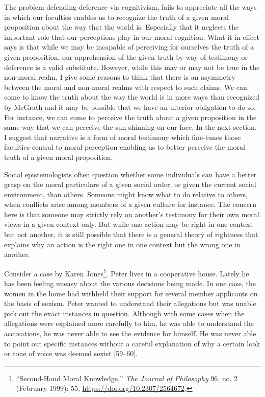 \documentclass[phdthesis,12pt,final,a4paper]{wuthesis}
\theoremstyle{definition}
\theoremstyle{definition}
\theoremstyle{definition}
\theoremstyle{definition}
\theoremstyle{remark}
\begin{document}
The problem defending deference via cognitivism, fails to appreciate all the ways in which our faculties enables us to recognize the truth of a given moral proposition about the way that the world is. Especially that it neglects the important role that our perceptions play in our moral cognition. What it in effect says is that while we may be incapable of perceiving for ourselves the truth of a given proposition, our apprehension of the given truth by way of testimony or deference is a valid substitute. However, while this may or may not be true in the non-moral realm, I give some reasons to think that there is an asymmetry between the moral and non-moral realms with respect to such claims. We can come to know the truth about the way the world is in more ways than recognized by McGrath and it may be possible that we have an ulterior obligation to do so. For instance, we can come to perceive the truth about a given proposition in the same way that we can perceive the sun shinning on our face. In the next section, I suggest that narrative is a form of moral testimony which fine-tunes those faculties central to moral perception enabling us to better perceive the moral truth of a given moral proposition.

Social epistemologists often question whether some individuals can have a better grasp on the moral particulars of a given social order, or given the current social environment, than others. Someone might know what to do relative to others, when conflicts arise among members of a given culture for instance. The concern here is that someone may strictly rely on another's testimony for their own moral views in a given context only. But while one action may be right in one context but not another, it is still possible that there is a general theory of rightness that explains why an action is the right one in one context but the wrong one in another.

Consider a case by Karen Jones\footnote{{``Second-{Hand Moral Knowledge},''} \emph{The Journal of Philosophy} 96, no. 2 (February 1999): 55, \url{https://doi.org/10.2307/2564672}.}. Peter lives in a cooperative house. Lately he has been feeling uneasy about the various decisions being made. In one case, the women in the home had withheld their support for several member applicants on the basis of sexism. Peter wanted to understand their allegations but was unable pick out the exact instances in question. Although with some cases when the allegations were explained more carefully to him, he was able to understand the accusations, he was never able to see the evidence for himself. He was never able to point out specific instances without a careful explanation of why a certain look or tone of voice was deemed sexist {[}59--60{]}.
\end{document}
